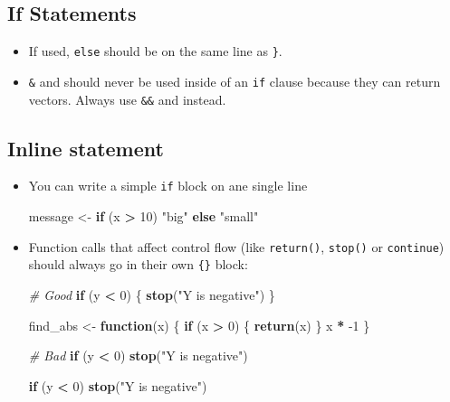 \documentclass[
]{book}
\newenvironment{Shaded}{\begin{snugshade}}{\end{snugshade}}
\newcommand{\CommentTok}[1]{\textcolor[rgb]{0.56,0.35,0.01}{\textit{#1}}}
\newcommand{\ControlFlowTok}[1]{\textcolor[rgb]{0.13,0.29,0.53}{\textbf{#1}}}
\newcommand{\DecValTok}[1]{\textcolor[rgb]{0.00,0.00,0.81}{#1}}
\newcommand{\KeywordTok}[1]{\textcolor[rgb]{0.13,0.29,0.53}{\textbf{#1}}}
\newcommand{\NormalTok}[1]{#1}
\newcommand{\OperatorTok}[1]{\textcolor[rgb]{0.81,0.36,0.00}{\textbf{#1}}}
\newcommand{\StringTok}[1]{\textcolor[rgb]{0.31,0.60,0.02}{#1}}
\providecommand{\tightlist}{%
  \setlength{\itemsep}{0pt}\setlength{\parskip}{0pt}}
\begin{document}
\hypertarget{if-statements}{%
\subsection{If Statements}\label{if-statements}}

\begin{itemize}
\tightlist
\item
  If used, \texttt{else} should be on the same line as \texttt{\}}.
\item
  \texttt{\&} and \texttt{\textbar{}} should never be used inside of an \texttt{if} clause because they can
  return vectors. Always use \texttt{\&\&} and \texttt{\textbar{}\textbar{}} instead.
\end{itemize}

\hypertarget{inline-statement}{%
\subsection{Inline statement}\label{inline-statement}}

\begin{itemize}
\item
  You can write a simple \texttt{if} block on ane single line

\begin{Shaded}
\begin{Highlighting}[]
\NormalTok{message <-}\StringTok{ }\ControlFlowTok{if}\NormalTok{ (x }\OperatorTok{>}\StringTok{ }\DecValTok{10}\NormalTok{) }\StringTok{"big"} \ControlFlowTok{else} \StringTok{"small"}
\end{Highlighting}
\end{Shaded}
\item
  Function calls that affect control flow (like \texttt{return()}, \texttt{stop()} or
  \texttt{continue}) should always go in their own \texttt{\{\}} block:

\begin{Shaded}
\begin{Highlighting}[]
\CommentTok{# Good}
\ControlFlowTok{if}\NormalTok{ (y }\OperatorTok{<}\StringTok{ }\DecValTok{0}\NormalTok{) \{}
    \KeywordTok{stop}\NormalTok{(}\StringTok{"Y is negative"}\NormalTok{)}
\NormalTok{\}}

\NormalTok{find_abs <-}\StringTok{ }\ControlFlowTok{function}\NormalTok{(x) \{}
    \ControlFlowTok{if}\NormalTok{ (x }\OperatorTok{>}\StringTok{ }\DecValTok{0}\NormalTok{) \{}
        \KeywordTok{return}\NormalTok{(x)}
\NormalTok{    \}}
\NormalTok{    x }\OperatorTok{*}\StringTok{ }\DecValTok{-1}
\NormalTok{\}}

\CommentTok{# Bad}
\ControlFlowTok{if}\NormalTok{ (y }\OperatorTok{<}\StringTok{ }\DecValTok{0}\NormalTok{) }\KeywordTok{stop}\NormalTok{(}\StringTok{"Y is negative"}\NormalTok{)}

\ControlFlowTok{if}\NormalTok{ (y }\OperatorTok{<}\StringTok{ }\DecValTok{0}\NormalTok{)}
    \KeywordTok{stop}\NormalTok{(}\StringTok{"Y is negative"}\NormalTok{)}
\end{Highlighting}
\end{Shaded}
\end{itemize}
\end{document}
